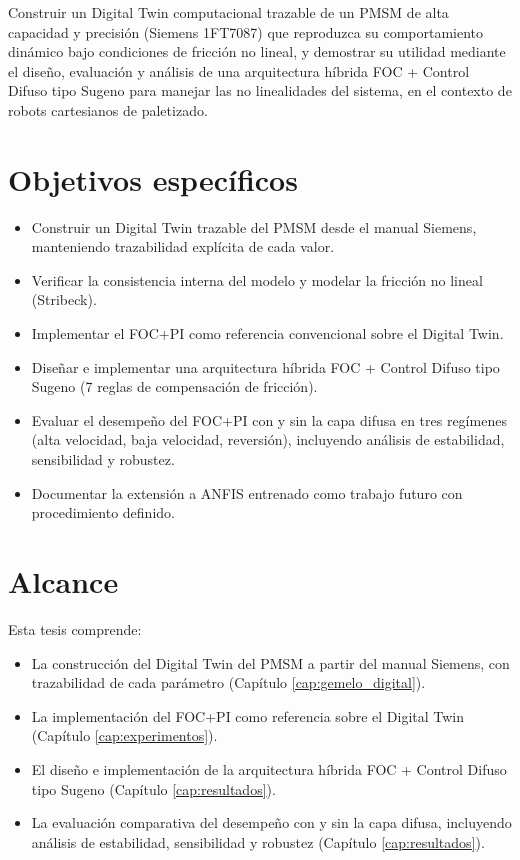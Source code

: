 Construir un Digital Twin computacional trazable de un PMSM de alta capacidad y precisión (Siemens 1FT7087) que reproduzca su comportamiento dinámico bajo condiciones de fricción no lineal, y demostrar su utilidad mediante el diseño, evaluación y análisis de una arquitectura híbrida FOC + Control Difuso tipo Sugeno para manejar las no linealidades del sistema, en el contexto de robots cartesianos de paletizado.

\section{Objetivos específicos}
\label{sec:objetivos_especificos}

\begin{itemize}
  \item Construir un Digital Twin trazable del PMSM desde el manual Siemens, manteniendo trazabilidad explícita de cada valor.
  
  \item Verificar la consistencia interna del modelo y modelar la fricción no lineal (Stribeck).
  
  \item Implementar el FOC+PI como referencia convencional sobre el Digital Twin.
  
  \item Diseñar e implementar una arquitectura híbrida FOC + Control Difuso tipo Sugeno (7 reglas de compensación de fricción).
  
  \item Evaluar el desempeño del FOC+PI con y sin la capa difusa en tres regímenes (alta velocidad, baja velocidad, reversión), incluyendo análisis de estabilidad, sensibilidad y robustez.
  
  \item Documentar la extensión a ANFIS entrenado como trabajo futuro con procedimiento definido.
\end{itemize}

\section{Alcance}
\label{sec:alcance}

Esta tesis comprende:

\begin{itemize}
  \item La construcción del Digital Twin del PMSM a partir del manual Siemens, con trazabilidad de cada parámetro (Capítulo \ref{cap:gemelo_digital}).
  
  \item La implementación del FOC+PI como referencia sobre el Digital Twin (Capítulo \ref{cap:experimentos}).
  
  \item El diseño e implementación de la arquitectura híbrida FOC + Control Difuso tipo Sugeno (Capítulo \ref{cap:resultados}).
  
  \item La evaluación comparativa del desempeño con y sin la capa difusa, incluyendo análisis de estabilidad, sensibilidad y robustez (Capítulo \ref{cap:resultados}).
\end{itemize}

